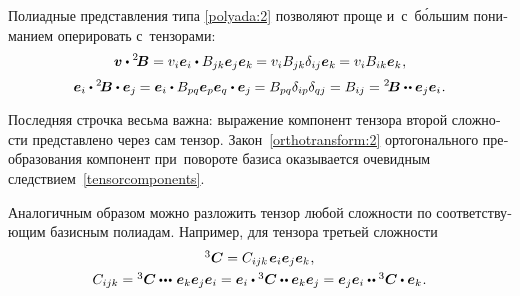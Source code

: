\begin{otherlanguage}{russian}
Полиадные представления типа \eqref{polyada:2} позволяют проще и~с~б\'{о}льшим пониманием оперировать с~тензорами:
\[ \bm{v} \dotp {^2\!\bm{B}} =
v_i\bm{e}_i \dotp B_{jk}\bm{e}_j\bm{e}_k \hspace{-0.1ex} =
v_i B_{jk} \delta_{ij} \bm{e}_k \hspace{-0.1ex} =
v_i B_{ik} \bm{e}_k \hspace{.1ex} , \]\vspace{-1.25em}
\begin{equation}\label{tensorcomponents}
\bm{e}_i \dotp {^2\!\bm{B}} \dotp \bm{e}_j \hspace{-0.1ex} =
\bm{e}_i \dotp B_{pq}\bm{e}_p\bm{e}_q \dotp \bm{e}_j \hspace{-0.1ex} =
B_{pq} \delta_{ip} \delta_{qj} =
B_{ij} =
{^2\!\bm{B}} \dotdotp \bm{e}_j \bm{e}_i \hspace{.1ex} .
\end{equation}

Последняя строчка весьма важна: выражение компонент тензора второй сложности представлено через сам тензор. Закон~\eqref{orthotransform:2} ортогонального преобразования компонент при~повороте базиса оказывается очевидным следствием~\eqref{tensorcomponents}.

Аналогичным образом можно разложить тензор любой сложности по соответствующим базисным полиадам. Например, для тензора третьей сложности
\vspace{0.2em}\begin{equation}\label{polyada:3}
\begin{array}{c}
{^3\!\,\bm{C}} = C_{ijk} \hspace{0.2ex} \bm{e}_i \bm{e}_j \bm{e}_k \hspace{0.1ex},\\[0.8ex]
C_{ijk} = {^3\!\,\bm{C}} \dotdotdotp \bm{e}_k \bm{e}_j \bm{e}_i = \bm{e}_i \dotp {^3\!\,\bm{C}} \dotdotp \bm{e}_k \bm{e}_j = \bm{e}_j \bm{e}_i \dotdotp {^3\!\,\bm{C}} \dotp \bm{e}_k \hspace{0.1ex}.
\end{array}
\end{equation}


\end{otherlanguage}
